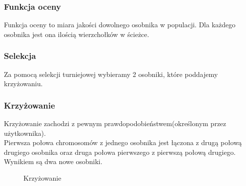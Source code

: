 \documentclass[a4paper,12pt]{article}
\begin{document}
\subsubsection{Funkcja oceny}
Funkcja oceny to miara jakości dowolnego osobnika w populacji. Dla każdego osobnika jest ona ilością wierzchołków w ścieżce.
\subsubsection{Selekcja}
Za pomocą selekcji turniejowej wybieramy 2 osobniki, które poddajemy krzyżowaniu.
\subsubsection{Krzyżowanie}
Krzyżowanie zachodzi z pewnym prawdopodobieństwem(określonym przez użytkownika).
\\
Pierwsza połowa chromosomów z jednego osobnika jest łączona z drugą połową drugiego osobnika oraz druga połowa pierwszego z pierwszą połową drugiego. Wynikiem są dwa nowe osobniki. 
\begin{figure}[htbp]
\caption{Krzyżowanie}
\end{figure}
\end{document}
